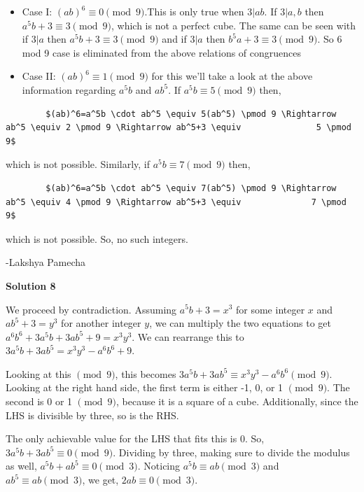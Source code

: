 \begin{enumerate}
 
            \begin{itemize}
        \item Case I: $(ab)^6\equiv 0 \pmod 9$.This is only true when $3|ab$. If $3|a,b$ then $a^5b+3 \equiv 3 \pmod 9$, which is not a perfect cube. The same can be seen with if $3|a$ then $a^5b+3 \equiv 3 \pmod 9$ and if $3|a$ then $b^5a+3 \equiv 3 \pmod 9$. So 6 mod 9 case is eliminated from the above relations of congruences
        \item Case II: $(ab)^6\equiv 1 \pmod 9$ for this we'll take a look at the above information regarding $a^5b$ and $ab^5$. If $a^5b \equiv 5 \pmod 9$ then,
            \end{itemize}
            \begin{verbatim}
		$(ab)^6=a^5b \cdot ab^5 \equiv 5(ab^5) \pmod 9 \Rightarrow ab^5 \equiv 2 \pmod 9 \Rightarrow ab^5+3 \equiv               5 \pmod 9$ 
\end{verbatim}

which is not possible. Similarly, if $a^5b \equiv 7 \pmod 9$ then,

 \begin{verbatim}
		$(ab)^6=a^5b \cdot ab^5 \equiv 7(ab^5) \pmod 9 \Rightarrow ab^5 \equiv 4 \pmod 9 \Rightarrow ab^5+3 \equiv              7 \pmod 9$
\end{verbatim}

which is not possible. So, no such integers.

 -Lakshya Pamecha

 



\textbf{Solution 8}

We proceed by contradiction. Assuming $a^5b + 3 = x^3$ for some integer $x$ and $ab^5 + 3 = y^3$ for another integer $y$, we can multiply the two equations to get $a^6b^6 + 3a^5b + 3ab^5 + 9 = x^3y^3$. We can rearrange this to $3a^5b+3ab^5 = x^3y^3 - a^6b^6 +9$.

 Looking at this $\pmod 9$, this becomes $3a^5b+3ab^5 \equiv x^3y^3-a^6b^6 \pmod 9$. Looking at the right hand side, the first term is either -1, 0, or 1 $\pmod 9$. The second is  0 or 1 $\pmod 9$, because it is a square of a cube. Additionally, since the LHS is divisible by three, so is the RHS.

 The only achievable value for the LHS that fits this is 0. So, $3a^5b+3ab^5 \equiv 0 \pmod 9$. Dividing by three, making sure to divide the modulus as well, $a^5b + ab^5 \equiv 0 \pmod 3$. Noticing $a^5b \equiv ab \pmod 3$ and $ab^5 \equiv ab \pmod 3$, we get, $2ab \equiv 0 \pmod 3$.


\end{enumerate}
